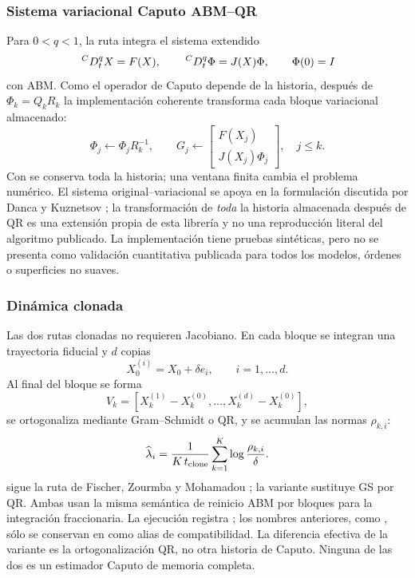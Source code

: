 \subsubsection{Sistema variacional Caputo ABM--QR}

Para \(0<q<1\), la ruta
 integra el sistema extendido
\[
 \,{}^{C}D_t^q X=F(X),\qquad
 \,{}^{C}D_t^q\Phi=J(X)\Phi,\qquad \Phi(0)=I
\]
con ABM. Como el operador de Caputo depende de la historia, después de
\(\Phi_k=Q_kR_k\) la implementación coherente transforma cada bloque
variacional almacenado:
\[
 \Phi_j\leftarrow \Phi_jR_k^{-1},
 \qquad
 G_j\leftarrow
 \begin{bmatrix}F(X_j)\\J(X_j)\Phi_j\end{bmatrix},
 \quad j\leq k.
\]
Con  se conserva toda la historia; una ventana
finita cambia el problema numérico. El sistema original--variacional se apoya
en la formulación discutida por Danca y Kuznetsov
\cite{DancaKuznetsov2018}; la transformación de \emph{toda} la historia
almacenada después de QR es una extensión propia de esta librería y no una
reproducción literal del algoritmo publicado. La implementación tiene pruebas
sintéticas, pero no se presenta como validación cuantitativa publicada para
todos los modelos, órdenes o superficies no suaves.

\subsubsection{Dinámica clonada}

Las dos rutas clonadas no requieren Jacobiano. En cada bloque se integran una
trayectoria fiducial y \(d\) copias
\[
 X^{(i)}_0=X_0+\delta e_i,\qquad i=1,\ldots,d.
\]
Al final del bloque se forma
\[
 V_k=\left[
 X^{(1)}_k-X^{(0)}_k,\ldots,
 X^{(d)}_k-X^{(0)}_k
 \right],
\]
se ortogonaliza mediante Gram--Schmidt o QR, y se acumulan las normas
\(\rho_{k,i}\):
\[
 \widehat\lambda_i=
 \frac1{K\,t_{\rm clone}}
 \sum_{k=1}^{K}\log\frac{\rho_{k,i}}{\delta}.
\]
 sigue la ruta de
Fischer, Zourmba y Mohamadou \cite{Fischer2020}; la variante
 sustituye GS por QR. Ambas usan
la misma semántica de reinicio ABM por bloques para la integración
fraccionaria. La ejecución registra
; los nombres
anteriores, como , sólo se conservan
en  como alias de compatibilidad. La
diferencia efectiva de la variante es la ortogonalización QR, no otra historia
de Caputo. Ninguna de las dos es un estimador Caputo de memoria completa.

